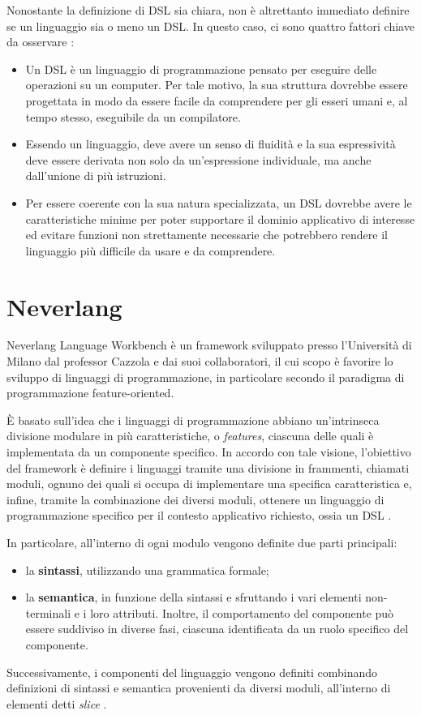 \documentclass[12pt,a4paper,openright,twoside]{book}
\begin{document}
Nonostante la definizione di \ac{DSL} sia chiara, non è altrettanto immediato definire se un linguaggio sia o meno un \ac{DSL}. In questo caso, ci sono 
quattro fattori chiave da osservare \cite{Fowler2010}:
\begin{itemize}
    \item Un \ac{DSL} è un linguaggio di programmazione pensato per eseguire delle operazioni su un computer. Per tale motivo, la sua struttura 
    dovrebbe essere progettata in modo da essere facile da comprendere per gli esseri umani e, al tempo stesso, eseguibile da un compilatore.
    \item Essendo un linguaggio, deve avere un senso di fluidità e la sua espressività deve essere derivata non solo da un’espressione 
    individuale, ma anche dall’unione di più istruzioni.
    \item Per essere coerente con la sua natura specializzata, un \ac{DSL} dovrebbe avere le caratteristiche minime per poter supportare il 
    dominio applicativo di interesse ed evitare funzioni non strettamente necessarie che potrebbero rendere il linguaggio più difficile 
    da usare e da comprendere.
\end{itemize}



\section{Neverlang}
Neverlang Language Workbench è un framework sviluppato presso l’Università di Milano dal professor Cazzola e dai suoi collaboratori, il cui 
scopo è favorire lo sviluppo di linguaggi di programmazione, in particolare secondo il paradigma di programmazione feature-oriented.

È basato sull’idea che i linguaggi di programmazione abbiano un’intrinseca divisione modulare in più caratteristiche, o \textit{features}, ciascuna 
delle quali è implementata da un componente specifico. In accordo con tale visione, l’obiettivo del framework è definire i linguaggi tramite 
una divisione in frammenti, chiamati moduli, ognuno dei quali si occupa di implementare una specifica caratteristica e, infine, tramite la 
combinazione dei diversi moduli, ottenere un linguaggio di programmazione specifico per il contesto applicativo richiesto, ossia un  
\ac{DSL} \cite{NeverlangWebsite}.

In particolare, all’interno di ogni modulo vengono definite due parti principali:
\begin{itemize}
    \item la \textbf{sintassi}, utilizzando una grammatica formale;
    \item la \textbf{semantica}, in funzione della sintassi e sfruttando i vari elementi non-terminali e i loro attributi. Inoltre, il 
    comportamento del componente può essere suddiviso in diverse fasi, ciascuna identificata da un ruolo specifico del componente.
\end{itemize}
Successivamente, i componenti del linguaggio vengono definiti combinando definizioni di sintassi e semantica provenienti da diversi moduli, 
all’interno di elementi detti \textit{slice} \cite{Vacchi2015}.
\end{document}
